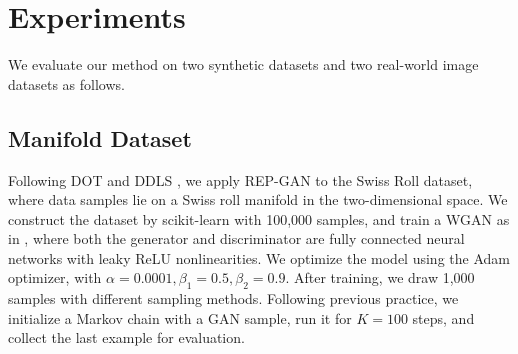 \documentclass[runningheads]{llncs}
\newcommand{\<}{\left\langle}
\renewcommand{\>}{\right\rangle}
\begin{document}


\section{Experiments}
\label{sec:experiments}
We evaluate our method  on two synthetic datasets and two real-world image datasets as follows.


\subsection{Manifold Dataset}
Following DOT \cite{tanaka2019discriminator} and DDLS \cite{che2020your}, we apply REP-GAN to the Swiss Roll dataset, where data samples lie on a Swiss roll manifold in the two-dimensional space. We construct the dataset by scikit-learn with 100,000 samples, and train a WGAN as in \cite{tanaka2019discriminator}, where both the generator and discriminator are fully connected neural networks with leaky ReLU nonlinearities. We optimize the model using the Adam optimizer, with $\alpha = 0.0001, \beta_1 = 0.5, \beta_2 = 0.9$.
After training, we draw 1,000 samples with different sampling methods. Following previous practice, we initialize a Markov chain with a GAN sample, run it for $K=100$ steps, and collect the last example for evaluation.
\end{document}
